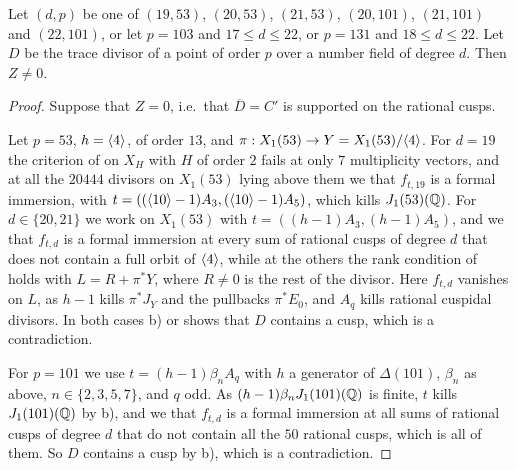 \begin{proposition}\label{prop:cusps2}
Let $(d,p)$ be one of $(19,53)$, $(20,53)$, $(21,53)$, $(20,101)$, $(21,101)$ and $(22,101)$, or let $p=103$ and $17\leq d\leq 22$, or $p=131$ and $18\leq d\leq 22$. Let $D$ be the trace divisor of a point of order $p$ over a number field of degree $d$. Then $Z\neq 0$.
\end{proposition}

\begin{proof}
Suppose that $Z=0$, i.e.\ that $\overline D=C'$ is supported on the rational cusps.

Let $p=53$, $h=\langle 4\rangle$, of order $13$, and $\pi:X_1(53)\to Y=X_1(53)/\langle 4\rangle$. For $d=19$ the criterion of  on $X_H$ with $H$ of order $2$ fails at only $7$ multiplicity vectors, and at all the $20444$ divisors on $X_1(53)$ lying above them we  that $f_{t,19}$ is a formal immersion, with $t=((\langle 10\rangle-1)A_3,(\langle 10\rangle-1)A_5)$, which kills $J_1(53)(\mathbb{Q})$. For $d\in\{20,21\}$ we work on $X_1(53)$ with $t=((h-1)A_3,(h-1)A_5)$, and we  that $f_{t,d}$ is a formal immersion at every sum of rational cusps of degree $d$ that does not contain a full orbit of $\langle 4\rangle$, while at the others the rank condition of  holds with $L=R+\pi^*Y$, where $R\neq0$ is the rest of the divisor. Here $f_{t,d}$ vanishes on $L$, as $h-1$ kills $\pi^*J_Y$ and the pullbacks $\pi^*E_0$, and $A_q$ kills rational cuspidal divisors. In both cases  b) or  shows that $D$ contains a cusp, which is a contradiction.

For $p=101$ we use $t=(h-1)\beta_nA_q$ with $h$ a generator of $\Delta(101)$, $\beta_n$ as above, $n\in\{2,3,5,7\}$, and $q$ odd. As $(h-1)\beta_nJ_1(101)(\mathbb{Q})$ is finite, $t$ kills $J_1(101)(\mathbb{Q})$ by  b), and we  that $f_{t,d}$ is a formal immersion at all sums of rational cusps of degree $d$ that do not contain all the $50$ rational cusps, which is all of them. So $D$ contains a cusp by  b), which is a contradiction.


\end{proof}

